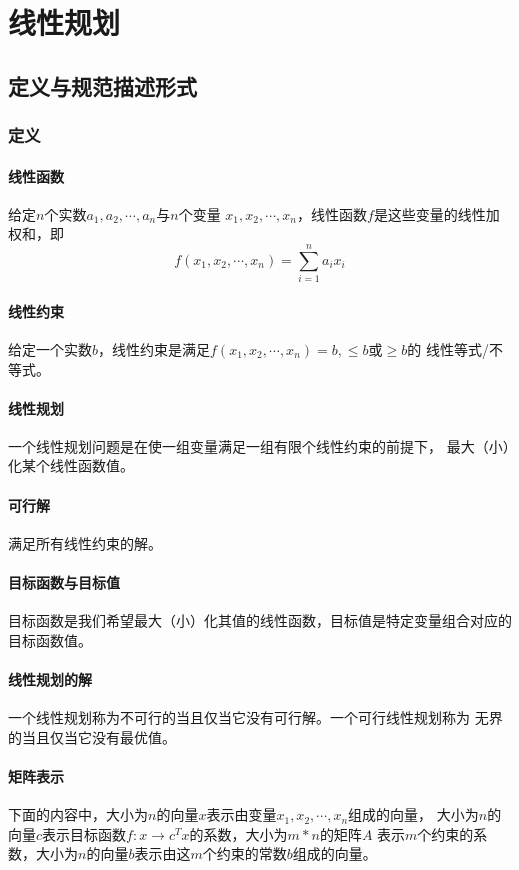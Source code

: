 \section{线性规划}\label{LP}
\subsection{定义与规范描述形式}
\subsubsection{定义}
\paragraph{线性函数} 给定$n$个实数$a_1,a_2,\cdots,a_n$与$n$个变量
$x_1,x_2,\cdots,x_n$，线性函数$f$是这些变量的线性加权和，即
\begin{displaymath}
    f(x_1,x_2,\cdots,x_n)=\sum_{i=1}^n{a_ix_i}
\end{displaymath}
\paragraph{线性约束}
给定一个实数$b$，线性约束是满足$f(x_1,x_2,\cdots,x_n)=b,\leq b$或$\geq b$的
线性等式/不等式。
\paragraph{线性规划}
一个线性规划问题是在使一组变量满足一组有限个线性约束的前提下，
最大（小）化某个线性函数值。
\paragraph{可行解}
满足所有线性约束的解。
\paragraph{目标函数与目标值}
目标函数是我们希望最大（小）化其值的线性函数，目标值是特定变量组合对应的目标函数值。
\paragraph{线性规划的解}
一个线性规划称为不可行的当且仅当它没有可行解。一个可行线性规划称为
无界的当且仅当它没有最优值。
\paragraph{矩阵表示}
下面的内容中，大小为$n$的向量$x$表示由变量$x_1,x_2,\cdots,x_n$组成的向量，
大小为$n$的向量$c$表示目标函数$f:x\rightarrow c^Tx$的系数，大小为$m*n$的矩阵$A$
表示$m$个约束的系数，大小为$n$的向量$b$表示由这$m$个约束的常数$b$组成的向量。
